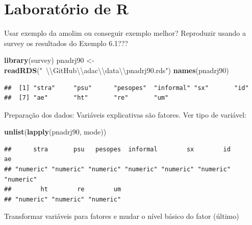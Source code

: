 \documentclass[]{book}
\newenvironment{Shaded}{\begin{snugshade}}{\end{snugshade}}
\newcommand{\KeywordTok}[1]{\textcolor[rgb]{0.13,0.29,0.53}{\textbf{{#1}}}}
\newcommand{\CharTok}[1]{\textcolor[rgb]{0.31,0.60,0.02}{{#1}}}
\newcommand{\StringTok}[1]{\textcolor[rgb]{0.31,0.60,0.02}{{#1}}}
\newcommand{\NormalTok}[1]{{#1}}
\numberwithin{example}{chapter}
\numberwithin{remark}{chapter}
\numberwithin{definition}{chapter}
\begin{document}
\section{Laboratório de R}\label{laboratorio-de-r-3}

Usar exemplo da amolim ou conseguir exemplo melhor? Reproduzir usando a
survey os resultados do Exemplo 6.1???

\begin{Shaded}
\begin{Highlighting}[]
\KeywordTok{library}\NormalTok{(survey)}
\NormalTok{pnadrj90 <-}\StringTok{ }\KeywordTok{readRDS}\NormalTok{(}\StringTok{"~}\CharTok{\textbackslash{}\textbackslash{}}\StringTok{GitHub}\CharTok{\textbackslash{}\textbackslash{}}\StringTok{adac}\CharTok{\textbackslash{}\textbackslash{}}\StringTok{data}\CharTok{\textbackslash{}\textbackslash{}}\StringTok{pnadrj90.rds"}\NormalTok{)}
\KeywordTok{names}\NormalTok{(pnadrj90)}
\end{Highlighting}
\end{Shaded}

\begin{verbatim}
##  [1] "stra"     "psu"      "pesopes"  "informal" "sx"       "id"      
##  [7] "ae"       "ht"       "re"       "um"
\end{verbatim}

Preparação dos dados: Variáveis explicativas são fatores. Ver tipo de
variável:

\begin{Shaded}
\begin{Highlighting}[]
\KeywordTok{unlist}\NormalTok{(}\KeywordTok{lapply}\NormalTok{(pnadrj90, mode))}
\end{Highlighting}
\end{Shaded}

\begin{verbatim}
##      stra       psu   pesopes  informal        sx        id        ae 
## "numeric" "numeric" "numeric" "numeric" "numeric" "numeric" "numeric" 
##        ht        re        um 
## "numeric" "numeric" "numeric"
\end{verbatim}

Transformar variáveis para fatores e mudar o nível básico do fator
(último)
\end{document}
